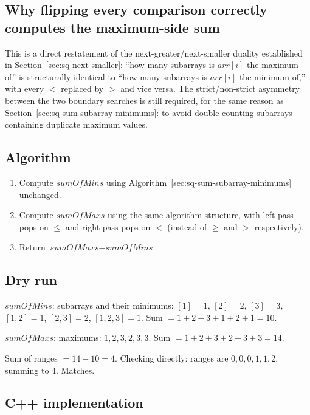 \subsection*{Why flipping every comparison correctly computes the maximum-side sum}

This is a direct restatement of the next-greater/next-smaller duality
established in Section~\ref{sec:sq-next-smaller}: ``how many subarrays is
$\textit{arr}[i]$ the maximum of'' is structurally identical to ``how many
subarrays is $\textit{arr}[i]$ the minimum of,'' with every $<$ replaced
by $>$ and vice versa. The strict/non-strict asymmetry between the two
boundary searches is still required, for the same reason as
Section~\ref{sec:sq-sum-subarray-minimums}: to avoid double-counting
subarrays containing duplicate maximum values.

\subsection*{Algorithm}

\begin{enumerate}
  \item Compute $\textit{sumOfMins}$ using
        Algorithm~\ref{sec:sq-sum-subarray-minimums} unchanged.
  \item Compute $\textit{sumOfMaxs}$ using the same algorithm structure,
        with left-pass pops on $\le$ and right-pass pops on $<$ (instead
        of $\ge$ and $>$ respectively).
  \item Return $\textit{sumOfMaxs} - \textit{sumOfMins}$.
\end{enumerate}

\subsection*{Dry run}


$\textit{sumOfMins}$: subarrays and their minimums: $[1]{=}1$, $[2]{=}2$,
$[3]{=}3$, $[1,2]{=}1$, $[2,3]{=}2$, $[1,2,3]{=}1$. Sum $=1+2+3+1+2+1=10$.

$\textit{sumOfMaxs}$: maximums: $1,2,3,2,3,3$. Sum
$=1+2+3+2+3+3=14$.

Sum of ranges $=14-10=4$. Checking directly: ranges are $0,0,0,1,1,2$,
summing to $4$. Matches.

\subsection*{C++ implementation}

